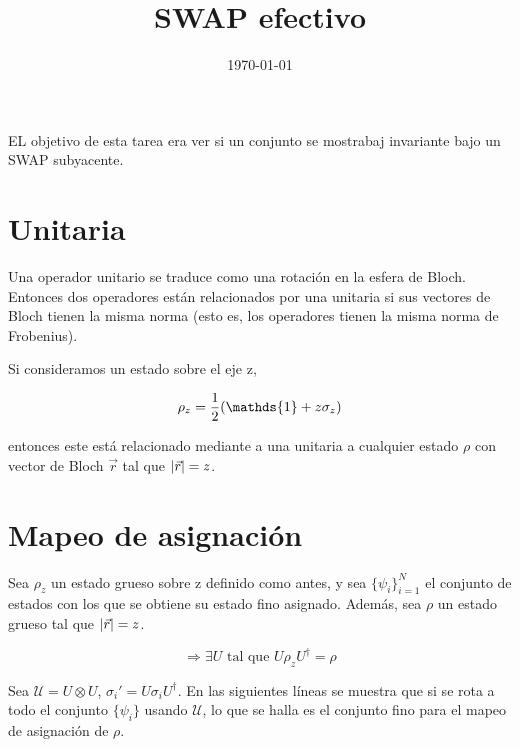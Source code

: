 \documentclass[onecolumn,11pt]{article}
\title{SWAP efectivo}
\date{\today}
\newcommand{\mcU}{\mathcal{U}}
\newcommand{\Id}{\mathds{1}}%
\begin{document}
\maketitle
\thispagestyle{empty}
EL objetivo de esta tarea era ver si un conjunto se mostrabaj invariante bajo un SWAP subyacente\cite{CGEmergingDynamics}.
\section{Unitaria}

Una operador unitario se traduce como una rotación en la esfera de Bloch. Entonces dos operadores están relacionados por una unitaria si sus vectores de Bloch tienen la misma norma (esto es, los operadores tienen la misma norma de Frobenius).

Si consideramos un estado sobre el eje z,

\begin{equation}
\rho_{z}=\frac{1}{2}\qty(\Id+z\sigma_{z})
\end{equation}

entonces este está relacionado mediante a una unitaria a cualquier estado $\rho$ con vector de Bloch $\vec{r}$ tal que $\abs{\vec{r}}=z$.

\section{Mapeo de asignación}

Sea $\rho_{z}$ un estado grueso sobre z definido como antes, y sea $\{\psi_{i}\}_{i=1}^{N}$ el conjunto de estados con los que se obtiene su estado fino asignado. Además, sea $\rho$ un estado grueso tal que $\abs{\vec{r}}=z$.

\begin{equation}
\Rightarrow \exists U \text{ tal que } U\rho_{z}U^{\dag}=\rho
\end{equation}

Sea $\mcU=U\otimes U$, $\sigma_{i}'=U\sigma_{i}U^{\dag}$. En las siguientes líneas se muestra que si se rota a todo el conjunto $\{\psi_{i}\}$ usando $\mcU$, lo que se halla es el conjunto fino para el mapeo de asignación de $\rho$.
\end{document}
